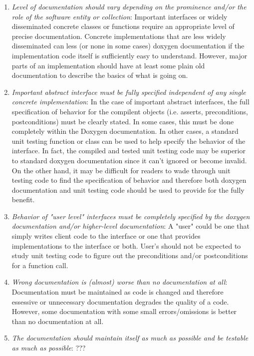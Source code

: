 \begin{enumerate}

{}\item\textit{Level of documentation should vary depending on the prominence
and/or the role of the software entity or collection}: Important interfaces or
widely disseminated concrete classes or functions require an appropriate level
of precise documentation.  Concrete implementations that are less widely
disseminated can less (or none in some cases) doxygen documentation if the
implementation code itself is sufficiently easy to understand.  However, major
parts of an implementation should have at least some plain old documentation
to describe the basics of what is going on.

{}\item\textit{Important abstract interface must be fully specified
independent of any single concrete implementation}: In the case of important
abstract interfaces, the full specification of behavior for the compilent
objects (i.e. asserts, preconditions, postconditions) must be clearly stated.
In some cases, this must be done completely within the Doxygen documentation.
In other cases, a standard unit testing function or class can be used to help
specify the behavior of the interface.  In fact, the compiled and tested unit
testing code may be superior to standard doxygen documentation since it can't
ignored or become invalid.  On the other hand, it may be difficult for readers
to wade through unit testing code to find the specification of behavior and
therefore both doxygen documentation and unit testing code should be used to
provide for the fully benefit.

{}\item\textit{Behavior of "user level" interfaces must be completely
specified by the doxygen documentation and/or higher-level documentation}: A
"user" could be one that simply writes client code to the interface or one
that provides implementations to the interface or both.  User's should not be
expected to study unit testing code to figure out the preconditions and/or
postconditions for a function call.

{}\item\textit{Wrong documentation is (almost) worse than no documentation at
all}: Documentation must be maintained as code is changed and therefore
essessive or unnecessary documentation degrades the quality of a code.
However, some documentation with some small errors/omissions is better than no
documentation at all.

{}\item\textit{The documentation should maintain itself as much as possible
and be testable as much as possible}: ???

\end{enumerate}

